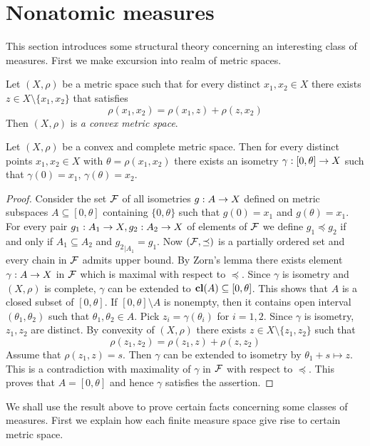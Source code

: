 \section{Nonatomic measures}
\noindent
This section introduces some structural theory concerning an interesting class of measures. First we make excursion into realm of metric spaces.

\begin{definition}
  Let $(X,\rho)$ be a metric space such that for every distinct $x_1,x_2 \in X$ there exists $z \in X \setminus \{x_1,x_2\}$ that satisfies 
  $$\rho(x_1,x_2) = \rho(x_1,z) + \rho(z,x_2)$$
  Then $(X,\rho)$ is \textit{a convex metric space}.
\end{definition}

\begin{theorem}\label{theorem:convex_and_complete_metric_spaces_are_isometrically_connected}
  Let $(X,\rho)$ be a convex and complete metric space. Then for every distinct points $x_1,x_2 \in X$ with $\theta = \rho(x_1,x_2)$ there exists an isometry $\gamma:[0,\theta] \rightarrow X$ such that $\gamma(0) = x_1,\,\gamma\left(\theta\right) = x_2$.
\end{theorem}
\begin{proof}
  Consider the set ${\mathcal F}$ of all isometries $g:A\rightarrow X$ defined on metric subspaces $A \subseteq [0,\theta]$ containing $\{0,\theta\}$ such that $g(0) = x_1$ and $g(\theta) = x_1$. For every pair $g_1:A_1\rightarrow X,g_2:A_2\rightarrow X$ of elements of ${\mathcal F}$ we define $g_1 \preceq g_2$ if and only if $A_1 \subseteq A_2$ and ${g_2}_{\mid A_1} = g_1$. Now $({\mathcal F},\preceq)$ is a partially ordered set and every chain in ${\mathcal F}$ admits upper bound. By Zorn's lemma there exists element $\gamma:A \rightarrow X$ in ${\mathcal F}$ which is maximal with respect to $\preceq$. Since $\gamma$ is isometry and $(X,\rho)$ is complete, $\gamma$ can be extended to $\mathbf{cl}(A) \subseteq [0,\theta]$. This shows that $A$ is a closed subset of $[0,\theta]$. If $[0,\theta] \setminus A$ is nonempty, then it contains open interval $(\theta_1, \theta_2)$ such that $\theta_1,\theta_2 \in A$. Pick $z_i = \gamma(\theta_i)$ for $i=1,2$. Since $\gamma$ is isometry, $z_1,z_2$ are distinct. By convexity of $(X,\rho)$ there exists $z \in X\setminus \{z_1,z_2\}$ such that
  $$\rho(z_1,z_2) = \rho(z_1,z) + \rho(z,z_2)$$
  Assume that $\rho(z_1,z) = s$. Then $\gamma$ can be extended to isometry by $\theta_1 + s \mapsto z$. This is a contradiction with maximality of $\gamma$ in ${\mathcal F}$ with respect to $\preceq$. This proves that $A = [0,\theta]$ and hence $\gamma$ satisfies the assertion.
\end{proof}
\noindent
We shall use the result above to prove certain facts concerning some classes of measures. First we explain how each finite measure space give rise to certain metric space.

